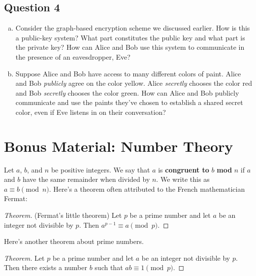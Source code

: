 \documentclass[12pt]{article}
\newenvironment{theorem}
{\begin{proof}[Theorem]}
{\end{proof}}
\begin{document}
\subsection*{Question 4}
\begin{enumerate}[(a)]
	\item Consider the graph-based encryption scheme we discussed earlier. How is this a public-key system? What part constitutes the public key and what part is the private key? How can Alice and Bob use this system to communicate in the presence of an eavesdropper, Eve?

	\vspace {3cm}

	\item Suppose Alice and Bob have access to many different colors of paint. Alice and Bob \textit{publicly} agree on the color yellow. Alice \textit{secretly} chooses the color red and Bob \textit{secretly} chooses the color green. How can Alice and Bob publicly communicate and use the paints they've chosen to establish a shared secret color, even if Eve listens in on their conversation?
\end{enumerate}

\newpage

\section*{Bonus Material: Number Theory}
Let $a$, $b$, and $n$ be positive integers. We say that $a$ is \textbf{congruent to} $b$ \textbf{mod} $n$ if $a$ and $b$ have the same remainder when divided by $n$. We write this as $a\equiv b\pmod{n}$. Here's a theorem often attributed to the French mathematician Fermat:
\begin{theorem}(Fermat's little theorem)
	Let $p$ be a prime number and let $a$ be an integer not divisible by $p$. Then $a^{p-1}\equiv a \pmod{p}$.
\end{theorem}

\noindent Here's another theorem about prime numbers.
\begin{theorem}
	Let $p$ be a prime number and let $a$ be an integer not divisible by $p$. Then there exists a number $b$ such that $ab\equiv 1\pmod{p}$.
\end{theorem}
\end{document}
